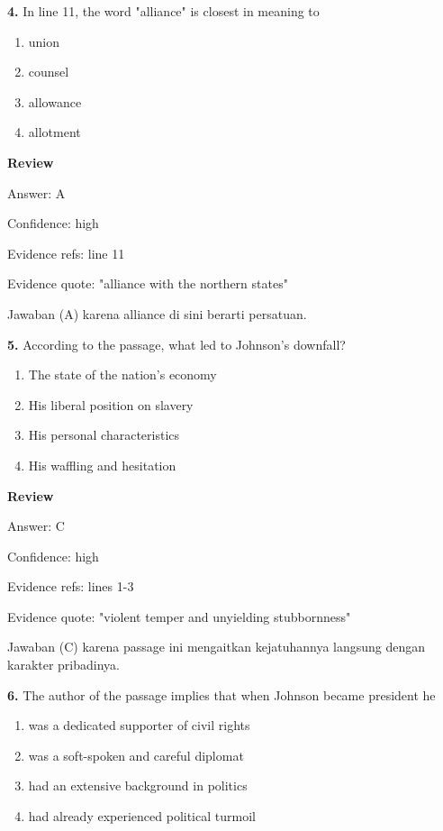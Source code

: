 \documentclass[12pt]{article}
\begin{document}
\endgroup
\par
\vspace{0.25\baselineskip}
\noindent\textbf{4.} In line 11, the word "alliance" is closest in meaning to
\begin{enumerate}[label=(\Alph*),leftmargin=*,itemsep=0.2em]
\item union
\item counsel
\item allowance
\item allotment
\end{enumerate}
\par
\begingroup
\setlength{\parskip}{0pt}
\setlength{\parindent}{0pt}
\textbf{Review}\par
Answer: A\par
Confidence: high\par
Evidence refs: line 11\par
Evidence quote: "alliance with the northern states"\par
Jawaban (A) karena alliance di sini berarti persatuan.\par
\endgroup
\par
\vspace{0.25\baselineskip}
\noindent\textbf{5.} According to the passage, what led to Johnson's downfall?
\begin{enumerate}[label=(\Alph*),leftmargin=*,itemsep=0.2em]
\item The state of the nation's economy
\item His liberal position on slavery
\item His personal characteristics
\item His waffling and hesitation
\end{enumerate}
\par
\begingroup
\setlength{\parskip}{0pt}
\setlength{\parindent}{0pt}
\textbf{Review}\par
Answer: C\par
Confidence: high\par
Evidence refs: lines 1-3\par
Evidence quote: "violent temper and unyielding stubbornness"\par
Jawaban (C) karena passage ini mengaitkan kejatuhannya langsung dengan karakter pribadinya.\par
\endgroup
\par
\vspace{0.25\baselineskip}
\noindent\textbf{6.} The author of the passage implies that when Johnson became president he
\begin{enumerate}[label=(\Alph*),leftmargin=*,itemsep=0.2em]
\item was a dedicated supporter of civil rights
\item was a soft-spoken and careful diplomat
\item had an extensive background in politics
\item had already experienced political turmoil
\end{enumerate}
\end{document}
